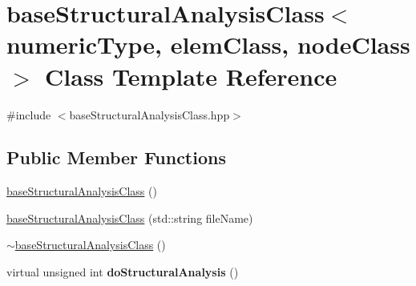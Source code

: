 \hypertarget{classbase_structural_analysis_class}{}\section{base\+Structural\+Analysis\+Class$<$ numeric\+Type, elem\+Class, node\+Class $>$ Class Template Reference}
\label{classbase_structural_analysis_class}


{\ttfamily \#include $<$base\+Structural\+Analysis\+Class.\+hpp$>$}

\subsection*{Public Member Functions}
\begin{DoxyCompactItemize}
\item 
\mbox{\hyperlink{classbase_structural_analysis_class_a743a6d6c9b29ce5c7e299ed246691b9a}{base\+Structural\+Analysis\+Class}} ()
\item 
\mbox{\hyperlink{classbase_structural_analysis_class_ac51091bf5f718cdc746c20d9cd5a0cab}{base\+Structural\+Analysis\+Class}} (std\+::string file\+Name)
\item 
\mbox{\hyperlink{classbase_structural_analysis_class_a70a5a3407cdeb6f32f69fb1fd7ba6e75}{$\sim$base\+Structural\+Analysis\+Class}} ()
\item 
\mbox{\label{classbase_structural_analysis_class_adea296e2d4cafa290794599b62e2abdd}} 
virtual unsigned int {\bfseries do\+Structural\+Analysis} ()
\end{DoxyCompactItemize}
